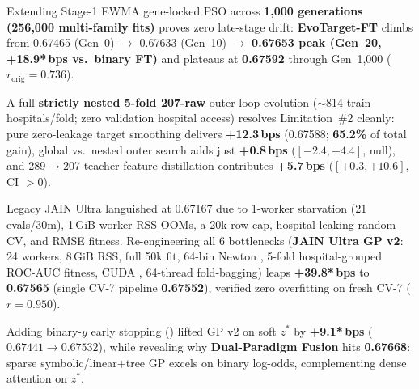 \documentclass[8.5pt,letterpaper]{article}
\begin{document}
\noindent
\begin{minipage}[t]{0.486\textwidth}
  \vspace{0pt}
  {\fontsize{7.85}{9.7}\selectfont
  Extending Stage-1 EWMA gene-locked PSO across \textbf{1,000 generations (256,000 multi-family fits)} proves zero late-stage drift: \textbf{EvoTarget-FT} climbs from 0.67465 (Gen~0) $\to$ 0.67633 (Gen~10) $\to$ \textbf{0.67653 peak (Gen~20, +18.9*\,bps vs.\ binary FT)} and plateaus at \textbf{0.67592} through Gen~1,000 ($r_{\mathrm{orig}}{=}0.736$).

  \vspace{2.0pt}
  A full \textbf{strictly nested 5-fold 207-raw} outer-loop evolution ($\sim$814 train hospitals/fold; zero validation hospital access) resolves Limitation~\#2 cleanly: pure zero-leakage target smoothing delivers \textbf{+12.3\,bps} (0.67588; \textbf{65.2\%} of total gain), global vs.\ nested outer search adds just \textbf{+0.8\,bps} ($[-2.4, +4.4]$, null), and 289$\to$207 teacher feature distillation contributes \textbf{+5.7\,bps} ($[+0.3, +10.6]$, CI $>0$).
  }
\end{minipage}\hfill
\begin{minipage}[t]{0.486\textwidth}
  \vspace{0pt}
  {\fontsize{7.85}{9.7}\selectfont
  Legacy JAIN Ultra languished at 0.67167 due to 1-worker starvation (21 evals/30m), 1\,GiB worker RSS OOMs, a 20k row cap, hospital-leaking random CV, and RMSE fitness. Re-engineering all 6 bottlenecks (\textbf{JAIN Ultra GP v2}: 24 workers, 8\,GiB RSS, full 50k fit, 64-bin Newton , 5-fold hospital-grouped ROC-AUC fitness, CUDA , 64-thread fold-bagging) leaps \textbf{+39.8*\,bps} to \textbf{0.67565} (single CV-7 pipeline \textbf{0.67552}), verified zero overfitting on fresh CV-7 ($r{=}0.950$).

  \vspace{2.0pt}
  Adding binary-$y$ early stopping () lifted GP v2 on soft $z^*$ by \textbf{+9.1*\,bps} ($0.67441 \to 0.67532$), while revealing why \textbf{Dual-Paradigm Fusion} hits \textbf{0.67668}: sparse symbolic/linear+tree GP excels on binary log-odds, complementing dense attention on $z^*$.
  }
\end{minipage}

\clearpage
\thispagestyle{briefpage2}
\end{document}
